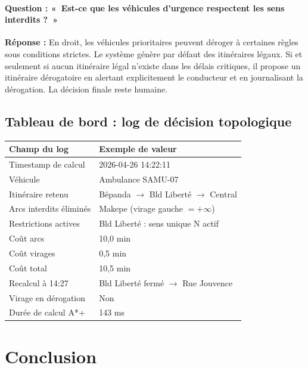 \documentclass[12pt,a4paper]{article}
\theoremstyle{definition}
\theoremstyle{remark}
\begin{document}
\paragraph{Question : «~Est-ce que les véhicules d'urgence respectent
les sens interdits ?~»}

\noindent\textbf{Réponse :} En droit, les véhicules prioritaires
peuvent déroger à certaines règles sous conditions strictes.
Le système génère par défaut des itinéraires légaux. Si et seulement si
aucun itinéraire légal n'existe dans les délais critiques,
il propose un itinéraire dérogatoire en alertant explicitement
le conducteur et en journalisant la dérogation. La décision
finale reste humaine.

\subsection{Tableau de bord : log de décision topologique}

\begin{center}
\begin{tabular}{ll}
  \toprule
  \textbf{Champ du log} & \textbf{Exemple de valeur} \\
  \midrule
  Timestamp de calcul          & 2026-04-26 14:22:11 \\
  Véhicule                     & Ambulance SAMU-07 \\
  Itinéraire retenu            & Bépanda $\to$ Bld Liberté $\to$ Central \\
  Arcs interdits éliminés      & Makepe (virage gauche $= +\infty$) \\
  Restrictions actives         & Bld Liberté : sens unique N actif \\
  Coût arcs                    & 10,0 min \\
  Coût virages                 & 0,5 min \\
  Coût total                   & 10,5 min \\
  Recalcul à 14:27             & Bld Liberté fermé $\to$ Rue Jouvence \\
  Virage en dérogation         & Non \\
  Durée de calcul A*+          & 143 ms \\
  \bottomrule
\end{tabular}
\end{center}

\newpage

\section*{Conclusion}
\end{document}
